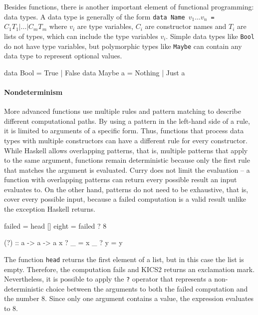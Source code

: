 \documentclass[paper = a4, fleqn, abstract=on, twoside]{scrreprt}
\newcommand{\coqinline}[1]{\texttt{#1}}
\begin{document}
\par \noindent
Besides functions, there is another important element of functional programming: data types. A data type is generally of the form \texttt{data Name $v_1 \dots v_n$ = $C_1 T_1 | \dots | C_m T_m$} where $v_i$ are type variables, $C_i$ are constructor names and $T_i$ are lists of types, which can include the type variables $v_i$. Simple data types like \coqinline{Bool} do not have type variables, but polymorphic types like \coqinline{Maybe} can contain any data type to represent optional values.
\begin{haskellcode}
data Bool = True | False
data Maybe a = Nothing | Just a
\end{haskellcode}
\paragraph{Nondeterminism}
More advanced functions use multiple rules and pattern matching to describe different computational paths. By using a pattern in the left-hand side of a rule, it is limited to arguments of a specific form. Thus, functions that process data types with multiple constructors can have a different rule for every constructor. While Haskell allows overlapping patterns, that is, multiple patterns that apply to the same argument, functions remain deterministic because only the first rule that matches the argument is evaluated. Curry does not limit the evaluation -- a function with overlapping patterns can return every possible result an input evaluates to. On the other hand, patterns do not need to be exhaustive, that is, cover every possible input, because a failed computation is a valid result unlike the exception Haskell returns.
\begin{flushleft}
	\begin{minipage}[t]{.3 \linewidth}
		\begin{haskellcode}
failed = head []
eight = failed ? 8
		\end{haskellcode}
	\end{minipage}
	\hfill
	\vrule
	\hspace{.5 em}
	\begin{minipage}[t]{.65 \linewidth}
		\begin{haskellcode}
(?) :: a -> a -> a
x ? _ = x
_ ? y = y
		\end{haskellcode}
	\end{minipage}
\end{flushleft}
\noindent
The function \texttt{head} returns the first element of a list, but in this case the list is empty. Therefore, the computation fails and KICS2 returns an exclamation mark. Nevertheless, it is possible to apply the \texttt{?} operator that represents a non-deterministic choice between the arguments to both the failed computation and the number 8. Since only one argument contains a value, the expression evaluates to 8.
\end{document}
